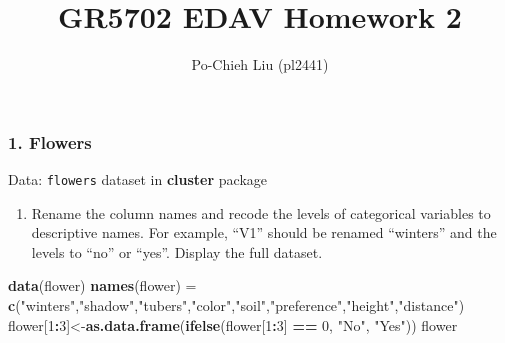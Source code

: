 \documentclass[]{article}
\title{GR5702 EDAV Homework 2}
\author{Po-Chieh Liu (pl2441)}
\date{}
\newenvironment{Shaded}{\begin{snugshade}}{\end{snugshade}}
\newcommand{\KeywordTok}[1]{\textcolor[rgb]{0.13,0.29,0.53}{\textbf{#1}}}
\newcommand{\DecValTok}[1]{\textcolor[rgb]{0.00,0.00,0.81}{#1}}
\newcommand{\StringTok}[1]{\textcolor[rgb]{0.31,0.60,0.02}{#1}}
\newcommand{\OperatorTok}[1]{\textcolor[rgb]{0.81,0.36,0.00}{\textbf{#1}}}
\newcommand{\NormalTok}[1]{#1}
\providecommand{\tightlist}{%
  \setlength{\itemsep}{0pt}\setlength{\parskip}{0pt}}
\begin{document}
\maketitle

\subsubsection{\texorpdfstring{1.
\textbf{Flowers}}{1. Flowers}}\label{flowers}

Data: \texttt{flowers} dataset in \textbf{cluster} package

\begin{enumerate}
\def\labelenumi{(\alph{enumi})}
\tightlist
\item
  Rename the column names and recode the levels of categorical variables
  to descriptive names. For example, ``V1'' should be renamed
  ``winters'' and the levels to ``no'' or ``yes''. Display the full
  dataset.
\end{enumerate}

\begin{Shaded}
\begin{Highlighting}[]
\KeywordTok{data}\NormalTok{(flower)}
\KeywordTok{names}\NormalTok{(flower) =}\StringTok{ }\KeywordTok{c}\NormalTok{(}\StringTok{"winters"}\NormalTok{,}\StringTok{"shadow"}\NormalTok{,}\StringTok{"tubers"}\NormalTok{,}\StringTok{"color"}\NormalTok{,}\StringTok{"soil"}\NormalTok{,}\StringTok{"preference"}\NormalTok{,}\StringTok{"height"}\NormalTok{,}\StringTok{"distance"}\NormalTok{)}
\NormalTok{flower[}\DecValTok{1}\OperatorTok{:}\DecValTok{3}\NormalTok{]<-}\KeywordTok{as.data.frame}\NormalTok{(}\KeywordTok{ifelse}\NormalTok{(flower[}\DecValTok{1}\OperatorTok{:}\DecValTok{3}\NormalTok{] }\OperatorTok{==}\StringTok{ }\DecValTok{0}\NormalTok{, }\StringTok{"No"}\NormalTok{, }\StringTok{"Yes"}\NormalTok{))}
\NormalTok{flower}
\end{Highlighting}
\end{Shaded}
\end{document}

